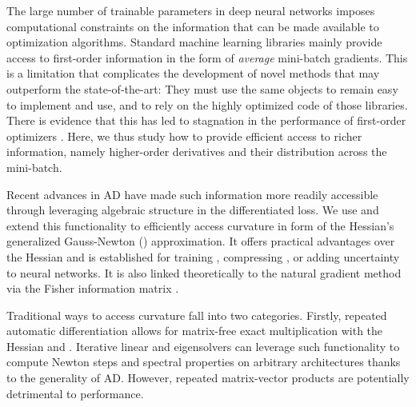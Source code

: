 The large number of trainable parameters in deep neural networks imposes
computational constraints on the information that can be made available to
optimization algorithms. Standard machine learning libraries
\citep{abadi2016tensorflow, paszke2019pytorch} mainly provide access to
first-order information in the form of \emph{average} mini-batch gradients. This
is a limitation that complicates the development of novel methods that may
outperform the state-of-the-art: They must use the same objects to remain easy
to implement and use, and to rely on the highly optimized code of those
libraries. There is evidence that this has led to stagnation in the performance
of first-order optimizers \citep{schmidt2021descending}. Here, we thus study how
to provide efficient access to richer information, namely higher-order
derivatives and their distribution across the mini-batch.



Recent advances in AD \citep{bradbury2018jax, dangel2020backpack} have made such
information more readily accessible through leveraging algebraic structure in
the differentiated loss. We use and extend this functionality to efficiently
access curvature in form of the Hessian's generalized Gauss-Newton (\ggn)
approximation. It offers practical advantages over the Hessian and is
established for training \citep{martens2010deep, martens2015optimizing},
compressing \citep{singh2020woodfisher}, or adding uncertainty to
\citep{ritter2018scalable, ritter2018online, kristiadi2020being} neural
networks.
It is also linked theoretically to the natural gradient method
\citep{amari1998natural} via the Fisher information matrix \citep[Section
9.2]{martens2014new}.

Traditional ways to access curvature fall into two categories. Firstly, repeated
automatic differentiation allows for matrix-free exact multiplication with the
Hessian \citep{pearlmutter1994fast} and \ggn \citep{schraudolph2002fast}.
Iterative linear and eigensolvers can leverage such functionality to compute
Newton steps \citep{martens2010deep, zhang2017blockdiagonal,
  gargiani2020promise} and spectral properties \citep{sagun2017eigenvalues,
  sagun2018empirical, adams2018estimating, ghorbani2019investigation,
  papyan2019spectrum, yao2020pyhessian, granziol2021deep} on arbitrary
architectures thanks to the generality of AD. However, repeated matrix-vector
products are potentially detrimental to performance.

